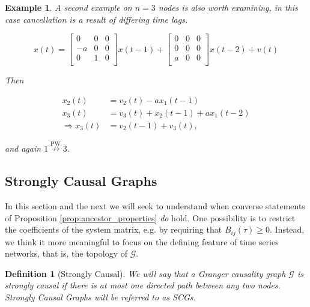 \documentclass{statsoc}
\def\npwgc{\overset{\text{PW}}{\nrightarrow}}  %
\def\gcg{\mathcal{G}}  %
\newtheorem{definition}{Definition}
\newtheorem{example}{Example}
\begin{document}
\begin{example}
  \label{ex:lag_cancellation}
  A second example on $n = 3$ nodes is also worth examining, in this case
  cancellation is a result of differing time lags.

\begin{equation*}
  x(t) =
  \left[
    \begin{array}{ccc}
      0 & 0 & 0\\
      -a & 0 & 0\\
      0 & 1 & 0\\
    \end{array}
  \right] x(t - 1) +
  \left[
    \begin{array}{ccc}
      0 & 0 & 0\\
      0 & 0 & 0\\
      a & 0 & 0\\
    \end{array}
  \right] x(t - 2) + v(t)
\end{equation*}

Then

\begin{align*}
  x_2(t) &= v_2(t) - ax_1(t - 1)\\
  x_3(t) &= v_3(t) + x_2(t - 1) + ax_1(t - 2)\\
  \Rightarrow x_3(t) &= v_2(t - 1) + v_3(t),
\end{align*}

and again $1 \npwgc 3$.
\end{example}

\subsection{Strongly Causal Graphs}
\label{sec:strongly_causal_graphs}

In this section and the next we will seek to understand when converse
statements of Proposition \ref{prop:ancestor_properties} \textit{do}
hold.  One possibility is to restrict the coefficients of the system
matrix, e.g. by requiring that $B_{ij}(\tau) \ge 0$.  Instead,
we think it more meaningful to focus on the defining feature of
time series networks, that is, the topology of $\gcg$.

\begin{definition}[Strongly Causal]
  \label{def:strongly_causal}
  We will say that a Granger causality graph $\gcg$ is
  \textit{strongly causal} if there is at most one directed path between
  any two nodes.  Strongly Causal Graphs will be referred to as SCGs.
\end{definition}
\end{document}
